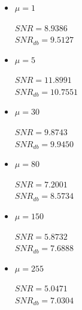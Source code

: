\documentclass[a4paper]{article}
\begin{document}
\subsubsection{}
\begin{itemize}
	\item 
	$\mu = 1$
	\begin{flushleft}
		$SNR = 8.9386$\\
		$SNR_{db} = 9.5127$
	\end{flushleft}
	\item 
	$\mu = 5$
	\begin{flushleft}
		$SNR = 11.8991$\\
		$SNR_{db} = 10.7551$
	\end{flushleft}
	\item 
	$\mu = 30$
	\begin{flushleft}
		$SNR = 9.8743$\\
		$SNR_{db} = 9.9450$
	\end{flushleft}
	\item 
	$\mu = 80$
	\begin{flushleft}
		$SNR = 7.2001$\\
		$SNR_{db} = 8.5734$
	\end{flushleft}
	\item 
	$\mu = 150$
	\begin{flushleft}
		$SNR = 5.8732 $\\
		$SNR_{db} = 7.6888 $
	\end{flushleft}
	\item 
	$\mu = 255$
	\begin{flushleft}
		$SNR = 5.0471$\\
		$SNR_{db} = 7.0304$
	\end{flushleft}
\end{itemize}
\end{document}
